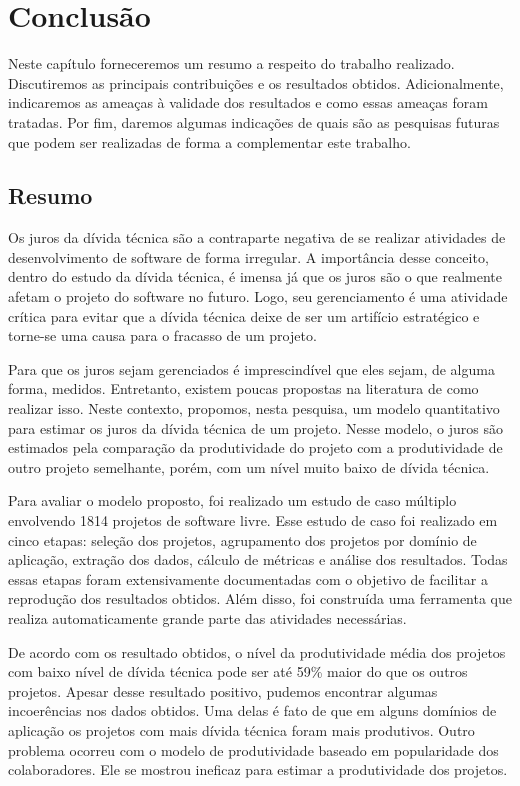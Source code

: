 \chapter{Conclusão}

Neste capítulo forneceremos um resumo a respeito do trabalho realizado. Discutiremos as principais contribuições e os resultados obtidos. Adicionalmente, indicaremos as ameaças à validade dos resultados e como essas ameaças foram tratadas. Por fim, daremos algumas indicações de quais são as pesquisas futuras que podem ser realizadas de forma a complementar este trabalho. 

\section{Resumo}

Os juros da dívida técnica são a contraparte negativa de se realizar atividades de desenvolvimento de software de forma irregular. A importância desse conceito, dentro do estudo da dívida técnica, é imensa já que os juros são o que realmente afetam o projeto do software no futuro. Logo, seu gerenciamento é uma atividade crítica para evitar que a dívida técnica deixe de ser um artifício estratégico e torne-se uma causa para o fracasso de um projeto. 

Para que os juros sejam gerenciados é imprescindível que eles sejam, de alguma forma, medidos. Entretanto, existem poucas propostas na literatura de como realizar isso. Neste contexto, propomos, nesta pesquisa, um modelo quantitativo para estimar os juros da dívida técnica de um projeto.  Nesse modelo, o juros são estimados pela comparação da produtividade do projeto com a produtividade de outro projeto semelhante, porém, com um nível muito baixo de dívida técnica. 

Para avaliar o modelo proposto, foi realizado um estudo de caso múltiplo envolvendo 1814 projetos de software livre. Esse estudo de caso foi realizado em cinco etapas: seleção dos projetos, agrupamento dos projetos por domínio de aplicação, extração dos dados, cálculo de métricas e análise dos resultados. Todas essas etapas foram extensivamente documentadas com o objetivo de facilitar a reprodução dos resultados obtidos. Além disso, foi construída uma ferramenta que realiza automaticamente grande parte das atividades necessárias.

De acordo com os resultado obtidos, o nível da produtividade média dos projetos com baixo nível de dívida técnica pode ser até 59\% maior do que os outros projetos. Apesar desse resultado positivo, pudemos encontrar algumas incoerências nos dados obtidos. Uma delas é fato de que em alguns domínios de aplicação os projetos com mais dívida técnica foram mais produtivos. Outro problema ocorreu com o modelo de produtividade baseado em popularidade dos colaboradores. Ele se mostrou ineficaz para estimar a produtividade dos projetos.



